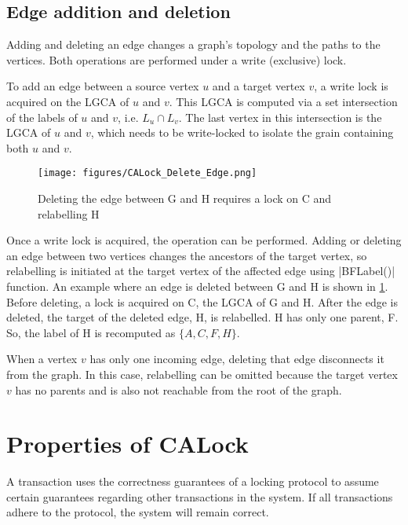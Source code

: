 \subsection{Edge addition and deletion}
Adding and deleting an edge changes a graph's topology and the paths to the vertices. 
Both operations are performed under a write (exclusive) lock. 

To add an edge between a source vertex $u$ and a target vertex $v$, a write lock is acquired on the LGCA of $u$ and $v$. This LGCA is computed via a set intersection of the labels of $u$ and $v$, i.e. $L_u \cap L_v$. The last vertex in this intersection is the LGCA of $u$ and $v$, which needs to be write-locked to isolate the grain containing both $u$ and $v$.

\begin{figure}[h]
	\centering
	\captionsetup{justification=centering}
	\texttt{[image: figures/CALock\_Delete\_Edge.png]}
	\caption{Deleting the edge between G and H requires a lock on C and relabelling H}
	\label{fig:calockedgedeletion}
\end{figure}

Once a write lock is acquired, the operation can be performed. Adding or deleting an edge between two vertices changes the ancestors of the target vertex, so relabelling is initiated at the target vertex of the affected edge using \inline|BFLabel()| function. An example where an edge is deleted between G and H  is shown in \cref{fig:calockedgedeletion}. Before deleting, a lock is acquired on C, the LGCA of G and H. After the edge is deleted, the target of the deleted edge, H, is relabelled. H has only one parent, F. So, the label of H is recomputed as $\{A, C, F, H\}$.

When a vertex $v$ has only one incoming edge, deleting that edge disconnects it from the graph. 
In this case, relabelling can be omitted because the target vertex $v$ has no parents and is also not reachable from the root of the graph. 



\section{Properties of CALock} \label{chap:formalProperties}


A transaction uses the correctness guarantees of a locking protocol to assume certain guarantees regarding other transactions in the system. If all transactions adhere to the protocol, the system will remain correct.

